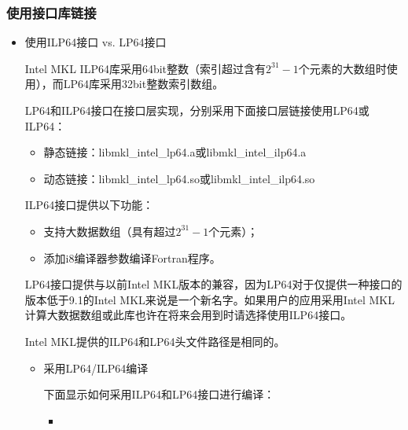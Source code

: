 \documentclass[a4paper,12pt,english]{sphinxmanual}
\begin{document}
\subsubsection{使用接口库链接}
\label{\detokenize{intel-mkl/intel-mkl:lp}}\label{\detokenize{intel-mkl/intel-mkl:id15}}\begin{itemize}
\item {} 
\sphinxAtStartPar
使用ILP64接口 vs. LP64接口

\sphinxAtStartPar
Intel MKL ILP64库采用64\sphinxhyphen{}bit整数（索引超过含有\(2^{31}-1\)个元素的大数组时使用），而LP64库采用32\sphinxhyphen{}bit整数索引数组。

\sphinxAtStartPar
LP64和ILP64接口在接口层实现，分别采用下面接口层链接使用LP64或ILP64：
\begin{itemize}
\item {} 
\sphinxAtStartPar
静态链接：libmkl\_intel\_lp64.a或libmkl\_intel\_ilp64.a

\item {} 
\sphinxAtStartPar
动态链接：libmkl\_intel\_lp64.so或libmkl\_intel\_ilp64.so

\end{itemize}

\sphinxAtStartPar
ILP64接口提供以下功能：
\begin{itemize}
\item {} 
\sphinxAtStartPar
支持大数据数组（具有超过\(2^{31}-1\)个元素）；

\item {} 
\sphinxAtStartPar
添加\sphinxhyphen{}i8编译器参数编译Fortran程序。

\end{itemize}

\sphinxAtStartPar
LP64接口提供与以前Intel MKL版本的兼容，因为LP64对于仅提供一种接口的版本低于9.1的Intel MKL来说是一个新名字。如果用户的应用采用Intel MKL计算大数据数组或此库也许在将来会用到时请选择使用ILP64接口。

\sphinxAtStartPar
Intel MKL提供的ILP64和LP64头文件路径是相同的。
\begin{itemize}
\item {} 
\sphinxAtStartPar
采用LP64/ILP64编译

\sphinxAtStartPar
下面显示如何采用ILP64和LP64接口进行编译：
\begin{itemize}
\item {} 


\end{itemize}
\end{itemize}
\end{itemize}
\end{document}
